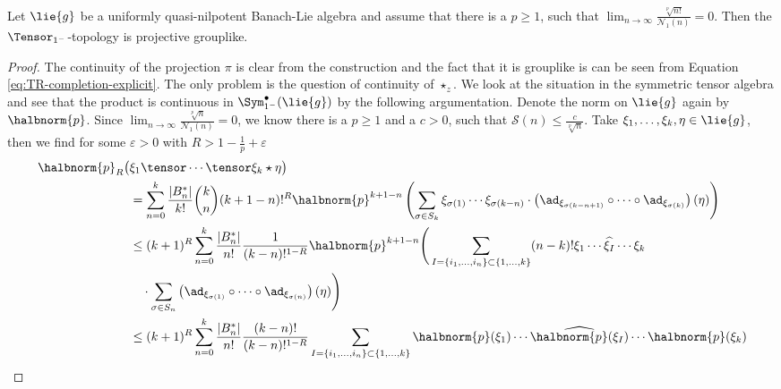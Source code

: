 \documentclass[
11pt,                          %
english                        %
]{article}
\begin{document}
\begin{proposition}
	\label{prop:mainthm_rev_1}
	Let $\lie{g}$ be a uniformly quasi-nilpotent Banach-Lie algebra and assume that 
	there is a $p \geq 1$, such that $\lim_{n \rightarrow \infty} 
	\frac{\sqrt[p]{n!}}{\mathcal{N}_1(n)} = 0$. Then the $\Tensor_{1^-}$-topology is 
	projective grouplike.
\end{proposition}
\begin{proof}
	The continuity of the projection $\pi$ is clear from the construction and the 
	fact that it is grouplike is can be seen from Equation 
	\eqref{eq:TR-completion-explicit}. The only problem is the question of 
	continuity of $\star_z$. We look at the situation in the symmetric tensor 
	algebra and see that the product is continuous in $\Sym_{1^-}^{\bullet}
	(\lie{g})$ by the following argumentation. Denote the norm on $\lie{g}$ 
	again by $\halbnorm{p}$. Since $\lim_{n \rightarrow \infty} 
	\frac{\sqrt[p]{n}}{\mathcal{N}_1(n)} = 0$, we know there is a $p \geq 1$ and a 
	$c > 0$, such that $\mathcal{S}(n) \leq \frac{c}{\sqrt[p]{n}}$. Take $\xi_1, 
	\ldots, \xi_k, \eta \in \lie{g}$, then we find for some $\varepsilon > 0$ with 
	$R > 1 - \frac{1}{p} + \varepsilon$
	\begin{align*}
		\halbnorm{p}_R \big(
		&
			\xi_1 \tensor \cdots \tensor \xi_k
			\star
			\eta
		\big)
		\\
		&=
		\sum\limits_{n = 0}^k
		\frac{|B_n^*|}{k!} \binom{k}{n}
		(k + 1 - n)!^R
		\halbnorm{p}^{k+1-n}
		\left(
			\sum	\limits_{\sigma \in S_k}
			\xi_{\sigma(1)} \cdots \xi_{\sigma(k-n)}
			\cdot
			\left( 
				\ad_{\xi_{\sigma(k-n+1)}} 
				\circ \cdots \circ
				\ad_{\xi_{\sigma(k)}}
			\right)
			(\eta)
		\right)
		\\
		& \leq
		(k + 1)^R
		\sum\limits_{n = 0}^k
		\frac{|B_n^*|}{n!}
		\frac{1}{(k-n)!^{1 - R}}
		\halbnorm{p}^{k+1-n}
		\Bigg(
			\sum\limits_{
				I = \{i_1, \ldots, i_n\} \subset \{1, \ldots, k\}
			}
			(n-k)!
			\xi_1 \cdots \widehat{\xi_I} \cdots \xi_k
		\\
		& \quad \cdot
			\sum	\limits_{\sigma \in S_n}
			\left( 
				\ad_{\xi_{\sigma(1)}} 
				\circ \cdots \circ
				\ad_{\xi_{\sigma(n)}}
			\right)
			(\eta)
		\Bigg)
		\\
		& \leq
		(k + 1)^R
		\sum\limits_{n = 0}^k
		\frac{|B_n^*|}{n!}
		\frac{(k-n)!}{(k-n)!^{1 - R}}
		\sum\limits_{
			I = \{i_1, \ldots, i_n\} \subset \{1, \ldots, k\}
		}
		\halbnorm{p}(\xi_1) 
		\cdots \widehat{\halbnorm{p}(\xi_I)} \cdots 
		\halbnorm{p}(\xi_k)
		\\

\end{align*}
\end{proof}
\end{document}
